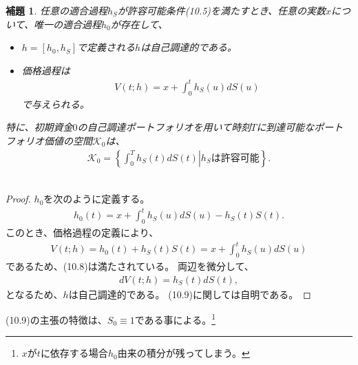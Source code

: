 \documentclass{jsbook}
\theoremstyle{withoutdotendstyle}
\newtheorem{lemma}[theorem]{補題}
\numberwithin{theorem}{chapter}%
\begin{document}
\begin{lemma}
  任意の適合過程$h_{S}$が許容可能条件(10.5)を満たすとき、任意の実数$x$について、唯一の適合過程$h_{0}$が存在して、
  \begin{itemize}
    \item $h=\left[h_{0}, h_{S}\right]$で定義される$h$は自己調達的である。
    \item 価格過程は
    \begin{align}
      V\left(t; h\right) = x + \int_{0}^{t}h_{S}\left(u\right)dS\left(u\right)
    \end{align}
    で与えられる。
  \end{itemize}
  特に、初期資金$0$の自己調達ポートフォリオを用いて時刻$T$に到達可能なポートフォリオ価値の空間$\mathcal{K}_{0}$は、
  \begin{align}
    \mathcal{K}_{0}=\left\{\left.\int_{0}^{T}h_{S}\left(t\right)dS\left(t\right)\right|h_{S}\mbox{は許容可能}\right\}.
  \end{align} 
\end{lemma}
\begin{proof}
  $h_{0}$を次のように定義する。
  \begin{align*}
    h_{0}\left(t\right) = x + \int_{0}^{t}h_{S}\left(u\right)dS\left(u\right) - h_{S}\left(t\right)S\left(t\right).
  \end{align*}
  このとき、価格過程の定義により、
  \begin{align*}
    V\left(t;h\right) = h_{0}\left(t\right) + h_{S}\left(t\right)S\left(t\right) = x + \int_{0}^{t}h_{S}\left(u\right)dS\left(u\right)
  \end{align*}
  であるため、(10.8)は満たされている。
  両辺を微分して、
  \begin{align*}
    dV\left(t;h\right)=h_{S}\left(t\right)dS\left(t\right),
  \end{align*}
  となるため、$h$は自己調達的である。
  (10.9)に関しては自明である。\footnotemark
\end{proof}
(10.9)の主張の特徴は、$S_{0}\equiv 1$である事による。\footnote{$x$が$t$に依存する場合$h_{0}$由来の積分が残ってしまう。}
\end{document}
